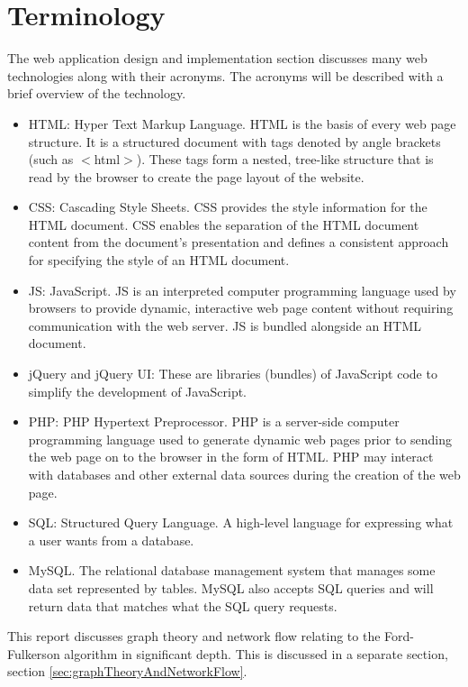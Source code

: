 \section{Terminology}

The web application design and implementation section discusses many
web technologies along with their acronyms. The acronyms will be
described with a brief overview of the technology.

\begin{itemize}
\item HTML: Hyper Text Markup Language. HTML is the basis of every web page
structure. It is a structured document with tags denoted by angle brackets (such
as $<$html$>$). These tags form a nested, tree-like structure that is read by 
the browser to create the page layout of the website.
\item CSS: Cascading Style Sheets. CSS provides the style information for the
HTML document. CSS enables the separation of the HTML document content from the
document's presentation and defines a consistent approach for specifying the 
style of an HTML document.
\item JS: JavaScript. JS is an interpreted computer programming language used by
browsers to provide dynamic, interactive web page content without requiring
communication with the web server. JS is bundled alongside an HTML document.
\item jQuery and jQuery UI: These are libraries (bundles) of JavaScript code to
simplify the development of JavaScript.
\item PHP: PHP Hypertext Preprocessor. PHP is a server-side computer programming
language used to generate dynamic web pages prior to sending the web page on to 
the browser in the form of HTML. PHP may interact with databases and other 
external data sources during the creation of the web page.
\item SQL: Structured Query Language. A high-level language for expressing what
a user wants from a database.
\item MySQL. The relational database management system that manages some data 
set represented by tables. MySQL also accepts SQL queries and will return data 
that matches what the SQL query requests.
\end{itemize}

This report discusses graph theory and network flow relating to the
Ford-Fulkerson algorithm in significant depth. This is discussed in a separate
section, section \ref{sec:graphTheoryAndNetworkFlow}.

